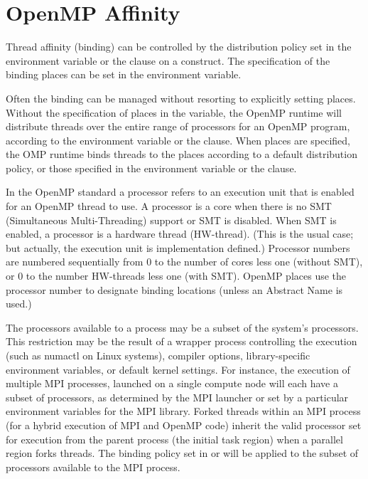 \pagebreak
\chapter{OpenMP Affinity}
\label{chap:openmp_affinity}

Thread affinity (binding) can be controlled by the distribution policy set in 
the  environment variable or the  clause on
a  construct. The specification of the binding places can be set 
in the  environment variable. 

Often the binding can be managed without resorting to explicitly setting places.
Without the specification of places in the  variable, 
the OpenMP runtime will distribute threads over the entire range of processors for 
an OpenMP program, according to the  environment variable
or the  clause.  When places are specified, the OMP runtime
binds threads to the places according to a default distribution policy, or
those specified in the  environment variable or the
 clause.

In the OpenMP standard a processor refers to an execution unit that
is enabled for an OpenMP thread to use.  A processor is a core when there is
no SMT (Simultaneous Multi-Threading) support or SMT is disabled.  When 
SMT is enabled, a processor is a hardware thread (HW-thread). (This is the
usual case; but actually, the execution unit is implementation defined.) Processor
numbers are numbered sequentially from 0 to the number of cores less one (without SMT), or
0 to the number HW-threads less one (with SMT). OpenMP places use the processor number to designate
binding locations (unless an Abstract Name is used.) 


The processors available to a process may be a subset of the system's
processors.  This restriction may be the result of a 
wrapper process controlling the execution (such as numactl on Linux systems), 
compiler options, library-specific environment variables, or default
kernel settings.  For instance, the execution of multiple MPI processes,
launched on a single compute node will each have a subset of processors, as
determined by the MPI launcher or set by a particular environment 
variables for the MPI library.  Forked threads within an MPI process
(for a hybrid execution of MPI and OpenMP code) inherit the valid 
processor set for execution from the parent process (the initial task region) 
when a parallel region forks threads.  The binding policy set in 
 or  will be applied to the subset of 
processors available to the MPI process.

